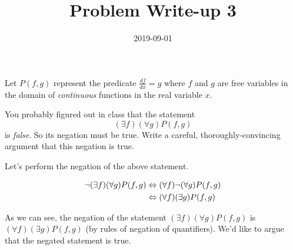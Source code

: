 \documentclass[a4paper,12pt]{article}
\title{Problem Write-up 3}
\date{2019-09-01}
\begin{document}
    \begin{problem}
        Let \(P(f,g)\) represent the predicate \(\frac{df}{dx} = g\) where \(f\) and \(g\) are free variables in the domain of \textit{continuous} functions in the real variable \(x\).

        You probably figured out in class that the statement \[(\exists f)(\forall g) P(f,g)\] is \textit{false}. So its negation must be true. Write a careful, thoroughly-convincing argument that this negation is true.

    \end{problem}
    \begin{answer}
        Let's perform the negation of the above statement.
        
        \begin{align*}
            \neg (\exists f)(\forall g) P(f,g) &\Leftrightarrow (\forall f) \neg (\forall g) P(f,g) \\
            &\Leftrightarrow (\forall f) (\exists g) P(f,g)
        \end{align*}
        
        As we can see, the negation of the statement \((\exists f)(\forall g) P(f,g)\) is \((\forall f) (\exists g) P(f,g)\) (by rules of negation of quantifiers). We'd like to argue that the negated statement is true.

    \end{answer}
\end{document}

